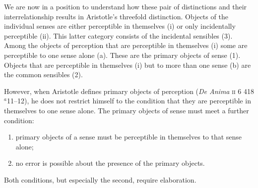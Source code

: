We are now in a position to understand how these pair of distinctions and their interrelationship results in Aristotle's threefold distinction. Objects of the individual senses are either perceptible in themselves (i) or only incidentally perceptible (ii). This latter category consists of the incidental sensibles (3). Among the objects of perception that are perceptible in themselves (i) some are perceptible to one sense alone (a). These are the primary objects of sense (1). Objects that are perceptible in themselves (i) but to more than one sense (b) are the common sensibles (2).

However, when Aristotle defines primary objects of perception (\emph{De Anima} \textsc{ii} 6 418\( ^{a} \)11--12), he does not restrict himself to the condition that they are perceptible in themselves to one sense alone. The primary objects of sense must meet a further condition: 
\begin{enumerate}[(1)]
	\item primary objects of a sense must be perceptible in themselves to that sense alone;
	\item no error is possible about the presence of the primary objects.
\end{enumerate}
Both conditions, but especially the second, require elaboration. 

